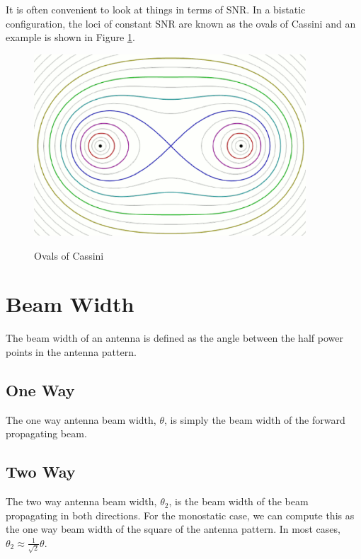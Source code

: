 It is often convenient to look at things in terms of SNR. In a bistatic configuration, the loci of constant SNR are known as the ovals of Cassini \cite{willis_bistatic} and an example is shown in Figure \ref{intro_fig:3}.
\begin{figure}[H]
  \begin{center}
\includegraphics[width=4in]{../media/multistatic/ovals_of_cassini.png}
  \end{center}
  \renewcommand{\baselinestretch}{1} \small\normalsize
  \begin{quote}
    \caption[Ovals of Cassini]{Ovals of Cassini\label{intro_fig:3}}
  \end{quote}
\end{figure}
\renewcommand{\baselinestretch}{2} \small\normalsize
\section{Beam Width}
The beam width of an antenna is defined as the angle between the half power points in the antenna pattern.

\subsection{One Way}
The one way antenna beam width, $\theta$, is simply the beam width of the forward propagating beam.

\subsection{Two Way}
The two way antenna beam width, $\theta_2$, is the beam width of the beam propagating in both directions. For the monostatic case, we can compute this as the one way beam width of the square of the antenna pattern. In most cases, $\theta_2 \approx \frac{1}{\sqrt{2}}\theta$.


